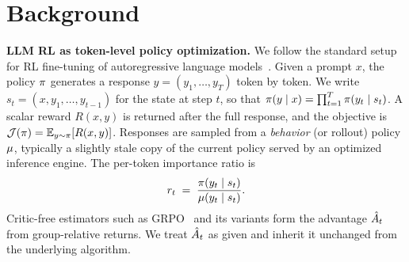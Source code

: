 \section{Background}
\label{sec:background}

\noindent\textbf{LLM RL as token-level policy optimization.}
We follow the standard setup for RL fine-tuning of autoregressive language
models~\citep{ouyang2022training,grpo,dppo}. Given a prompt $x$, the policy $\pi$
generates a response $y=(y_1,\dots,y_T)$ token by token.
We write $s_t=(x,y_1,\dots,y_{t-1})$ for the state at step $t$, so that
$\pi(y\mid x)=\prod_{t=1}^{T}\pi(y_t\mid s_t)$. A scalar reward $R(x,y)$ is
returned after the full response, and the objective is
$\mathcal{J}(\pi)=\mathbb{E}_{y\sim\pi}[R(x,y)]$. Responses are sampled from a \emph{behavior} (or rollout) policy $\mu$,
typically a slightly stale copy of the current policy served by an optimized
inference engine.
The per-token importance ratio is
\begin{equation}
\label{eq:ratio}
r_t \;=\; \frac{\pi(y_t\mid s_t)}{\mu(y_t\mid s_t)}.
\end{equation}
Critic-free estimators such as GRPO~\citep{grpo} and its variants
\citep{ahmadian2024back,drgrpo} form the advantage $\hat{A}_t$ from group-relative
returns.
We treat $\hat{A}_t$ as given and inherit it unchanged from the underlying
algorithm.

